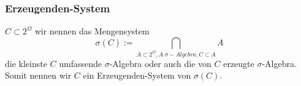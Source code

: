 \documentclass[a4paper]{article}
\theoremstyle{definition}
\begin{document}
\begin{theorem} %
	\subsubsection{Erzeugenden-System}
	$C \subset 2 ^{\Omega}$ wir nennen das Mengensystem
	\[
		\sigma(C) := \underset{A \subset 2^{\Omega}, A \; \sigma-Algebra, C \subset A}
		\bigcap A
	\] 
	die kleinste $C$ umfassende $\sigma$-Algebra oder auch die von $C$ erzeugte
	$\sigma$-Algebra. Somit nennen wir $C$ ein Erzeugenden-System von $\sigma(C)$.
\end{theorem}
\end{document}
